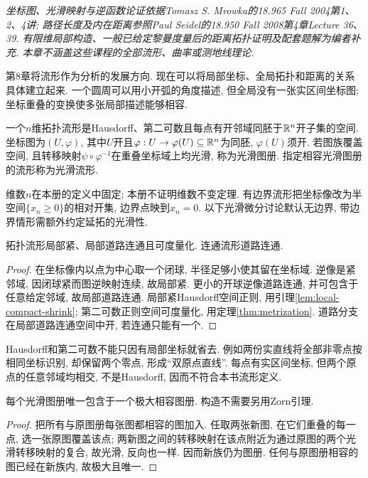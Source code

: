 \label{ch:manifolds}
\emph{坐标图、光滑映射与逆函数论证依据Tomasz S. Mrowka的18.965 Fall 2004第1、2、4讲; 路径长度及内在距离参照Paul Seidel的18.950 Fall 2008第4章Lecture 36、39. 有限维局部构造、一般已给定黎曼度量后的距离拓扑证明及配套题解为编者补充. 本章不涵盖这些课程的全部流形、曲率或测地线理论.}

第8章将流形作为分析的发展方向. 现在可以将局部坐标、全局拓扑和距离的关系具体建立起来. 一个圆周可以用小开弧的角度描述, 但全局没有一张实区间坐标图; 坐标重叠的变换使多张局部描述能够相容.
\begin{definition}
一个$n$维拓扑流形是Hausdorff、第二可数且每点有开邻域同胚于$\mathbb R^n$开子集的空间. 坐标图为$(U,\varphi)$, 其中$U$开且$\varphi:U\to\varphi(U)\subseteq\mathbb R^n$为同胚, $\varphi(U)$须开. 若图族覆盖空间, 且转移映射$\psi\circ\varphi^{-1}$在重叠坐标域上均光滑, 称为光滑图册. 指定相容光滑图册的流形称为光滑流形.
\end{definition}
维数$n$在本册的定义中固定; 本册不证明维数不变定理. 有边界流形把坐标像改为半空间$\{x_n\ge0\}$的相对开集, 边界点映到$x_n=0$. 以下光滑微分讨论默认无边界, 带边界情形需额外约定延拓的光滑性.

\begin{proposition}\label{thm:manifold-metrizable}
拓扑流形局部紧、局部道路连通且可度量化. 连通流形道路连通.
\end{proposition}
\begin{proof}
在坐标像内以点为中心取一个闭球, 半径足够小使其留在坐标域. 逆像是紧邻域, 因闭球紧而图逆映射连续, 故局部紧. 更小的开球逆像道路连通, 并可包含于任意给定邻域, 故局部道路连通. 局部紧Hausdorff空间正则, 用引理\ref{lem:local-compact-shrink}; 第二可数正则空间可度量化, 用定理\ref{thm:metrization}. 道路分支在局部道路连通空间中开, 若连通只能有一个.
\end{proof}
Hausdorff和第二可数不能只因有局部坐标就省去. 例如两份实直线将全部非零点按相同坐标识别, 却保留两个零点, 形成“双原点直线”. 每点有实区间坐标, 但两个原点的任意邻域均相交, 不是Hausdorff, 因而不符合本书流形定义.

\begin{proposition}
每个光滑图册唯一包含于一个极大相容图册. 构造不需要另用Zorn引理.
\end{proposition}
\begin{proof}
把所有与原图册每张图都相容的图加入. 任取两张新图, 在它们重叠的每一点, 选一张原图覆盖该点; 两新图之间的转移映射在该点附近为通过原图的两个光滑转移映射的复合, 故光滑, 反向也一样. 因而新族仍为图册. 任何与原图册相容的图已经在新族内, 故极大且唯一.
\end{proof}

